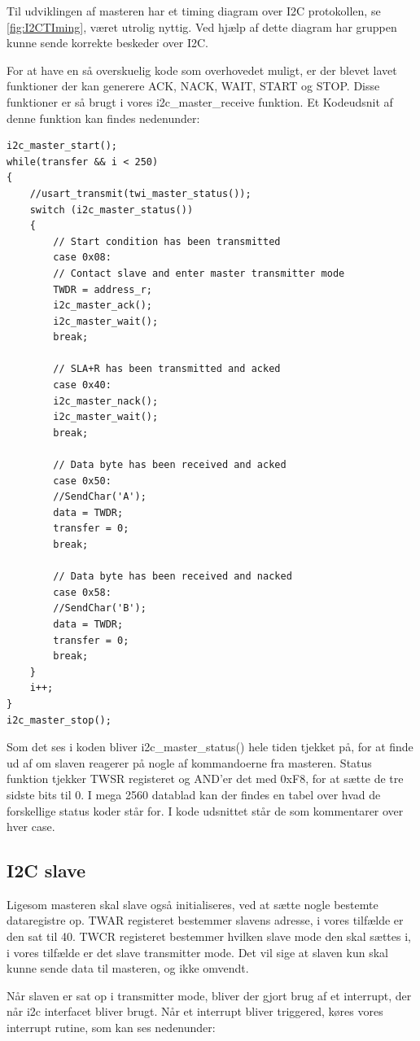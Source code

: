 Til udviklingen af masteren har et timing diagram over I2C protokollen, se \autoref{fig:I2CTIming}, været utrolig nyttig. Ved hjælp af dette diagram har gruppen kunne sende korrekte beskeder over I2C. 

For at have en så overskuelig kode som overhovedet muligt, er der blevet lavet funktioner der kan generere ACK, NACK, WAIT, START og STOP. Disse funktioner er så brugt i vores i2c\_master\_receive funktion. Et Kodeudsnit af denne funktion kan findes nedenunder:

\newpage

\begin{lstlisting}
i2c_master_start();
while(transfer && i < 250)
{
	//usart_transmit(twi_master_status());
	switch (i2c_master_status())
	{
		// Start condition has been transmitted
		case 0x08:
		// Contact slave and enter master transmitter mode
		TWDR = address_r;
		i2c_master_ack();
		i2c_master_wait();
		break;
		
		// SLA+R has been transmitted and acked
		case 0x40:
		i2c_master_nack();
		i2c_master_wait();
		break;
		
		// Data byte has been received and acked
		case 0x50:
		//SendChar('A');
		data = TWDR;
		transfer = 0;
		break;
		
		// Data byte has been received and nacked
		case 0x58:
		//SendChar('B');
		data = TWDR;
		transfer = 0;
		break;
	}
	i++;
}
i2c_master_stop();
\end{lstlisting}

Som det ses i koden bliver i2c\_master\_status() hele tiden tjekket på, for at finde ud af om slaven reagerer på nogle af kommandoerne fra masteren. Status funktion tjekker TWSR registeret og AND'er det med 0xF8, for at sætte de tre sidste bits til 0. I mega 2560 datablad kan der findes en tabel over hvad de forskellige status koder står for. I kode udsnittet står de som kommentarer over hver case.

\subsection{I2C slave}
Ligesom masteren skal slave også initialiseres, ved at sætte nogle bestemte dataregistre op. TWAR registeret bestemmer slavens adresse, i vores tilfælde er den sat til 40. TWCR registeret bestemmer hvilken slave mode den skal sættes i, i vores tilfælde er det slave transmitter mode. Det vil sige at slaven kun skal kunne sende data til masteren, og ikke omvendt. 

Når slaven er sat op i transmitter mode, bliver der gjort brug af et interrupt, der når i2c interfacet bliver brugt. Når et interrupt bliver triggered, køres vores interrupt rutine, som kan ses nedenunder:

